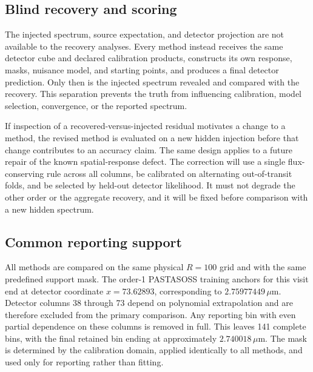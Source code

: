 \subsection{Blind recovery and scoring}

The injected spectrum, source expectation, and detector projection are not
available to the recovery analyses. Every method instead receives the same
detector cube and declared calibration products, constructs its own response,
masks, nuisance model, and starting points, and produces a final detector
prediction. Only then is the injected spectrum revealed and compared with the
recovery. This separation prevents the truth from influencing calibration,
model selection, convergence, or the reported spectrum.

If inspection of a recovered-versus-injected residual motivates a change to a
method, the revised method is evaluated on a new hidden injection before that
change contributes to an accuracy claim. The same design applies to a future
repair of the known spatial-response defect. The correction will use a single
flux-conserving rule across all columns, be calibrated on alternating
out-of-transit folds, and be selected by held-out detector likelihood. It must
not degrade the other order or the aggregate recovery, and it will be fixed
before comparison with a new hidden spectrum.

\subsection{Common reporting support}

All methods are compared on the same physical $R=100$ grid and with the same
predefined support mask. The order-1 PASTASOSS training anchors for this visit
end at detector coordinate $x=73.62893$, corresponding to
$2.75977449\,\mu\mathrm{m}$. Detector columns 38 through 73 depend on
polynomial extrapolation and are therefore excluded from the primary
comparison. Any reporting bin with even partial dependence on these columns is
removed in full. This leaves 141 complete bins, with the final retained bin
ending at approximately $2.740018\,\mu\mathrm{m}$. The mask is determined by
the calibration domain, applied identically to all methods, and used only for
reporting rather than fitting.

